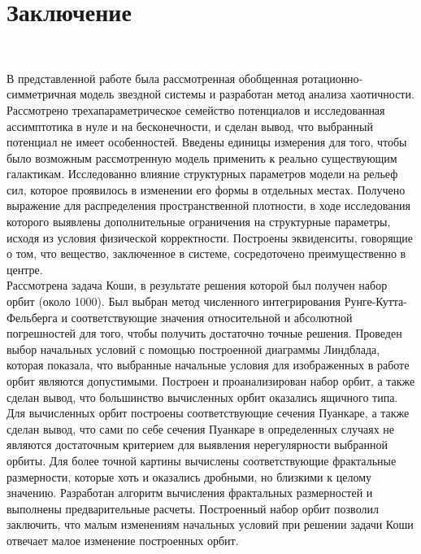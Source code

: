 \section*{Заключение}
~\par
В представленной работе была рассмотренная обобщенная ротационно-сим\-мет\-рич\-ная модель звездной системы и разработан метод анализа хаотичности.\\

Рассмотрено трехапараметрическое семейство потенциалов и исследованная ассимптотика в нуле и на бесконечности, и сделан вывод, что выбранный потенциал не имеет особенностей. Введены единицы измерения для того, чтобы было возможным рассмотренную модель применить к реально существующим галактикам. Исследованно влияние структурных параметров модели на рельеф сил, которое проявилось в изменении его формы в отдельных местах. Получено выражение для распределения пространственной плотности, в ходе исследования которого выявлены дополнительные ограничения на структурные параметры, исходя из условия физической корректности. Построены эквиденситы, говорящие о том, что вещество, заключенное в системе, сосредоточено преимущественно в центре.\\

Рассмотрена задача Коши, в результате решения которой был получен набор орбит (около 1000). Был выбран метод численного интегрирования Рунге-Кутта-Фельберга и соответствующие значения относительной и абсолютной погрешностей для того, чтобы получить достаточно точные решения. Проведен выбор начальных условий с помощью построенной диаграммы Линдблада, которая показала, что выбранные начальные условия для изображенных в работе орбит являются допустимыми. Построен и проанализирован набор орбит, а также сделан вывод, что большинство вычисленных орбит оказались ящичного типа.\\

Для вычисленных орбит построены соответствующие сечения Пуанкаре, а также сделан вывод, что сами по себе сечения Пуанкаре в определенных случаях не являются достаточным критерием для выявления нерегулярности выбранной орбиты. Для более точной картины вычислены соответствующие фрактальные размерности, которые хоть и оказались дробными, но близкими к целому значению. Разработан алгоритм вычисления фрактальных размерностей и выполнены предварительные расчеты. Построенный набор орбит позволил заключить, что малым изменениям начальных условий при решении задачи Коши отвечает малое изменение построенных орбит.

